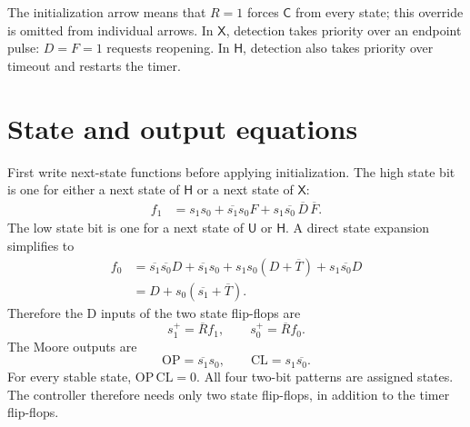 \begin{center}
\end{center}
The initialization arrow means that \(R=1\) forces \(\mathsf C\) from
every state; this override is omitted from individual arrows.
In \(\mathsf X\), detection takes priority over an endpoint pulse:
\(D=F=1\) requests reopening. In \(\mathsf H\), detection also takes
priority over timeout and restarts the timer.

\section{State and output equations}
First write next-state functions before applying initialization.
The high state bit is one for either a next state of \(\mathsf H\)
or a next state of \(\mathsf X\):
\begin{align*}
f_1
&=s_1s_0+\overline{s_1}s_0F
  +s_1\overline{s_0}\,\overline D\,\overline F.
\end{align*}
The low state bit is one for a next state of \(\mathsf U\) or
\(\mathsf H\). A direct state expansion simplifies to
\begin{align*}
f_0
&=\overline{s_1}\overline{s_0}D+\overline{s_1}s_0
  +s_1s_0(D+\overline T)+s_1\overline{s_0}D\\
&=D+s_0(\overline{s_1}+\overline T).
\end{align*}
Therefore the D inputs of the two state flip-flops are
\[
\boxed{s_1^+=\overline R f_1,\qquad
s_0^+=\overline R f_0.}
\]
The Moore outputs are
\[
\boxed{\mathrm{OP}=\overline{s_1}s_0,\qquad
\mathrm{CL}=s_1\overline{s_0}.}
\]
For every stable state,
\(\mathrm{OP}\,\mathrm{CL}=0\). All four two-bit patterns are assigned
states. The controller therefore needs only two state flip-flops,
in addition to the timer flip-flops.

